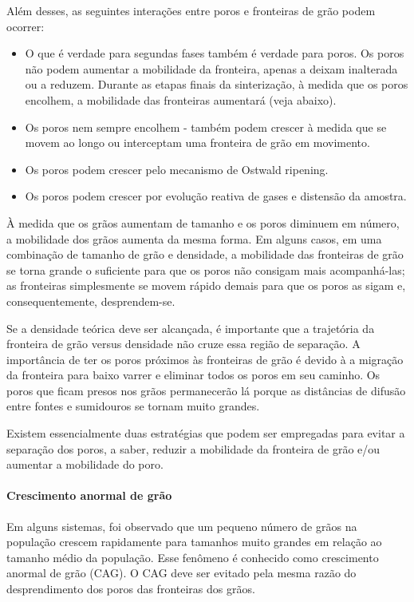 Além desses, as seguintes interações entre poros e fronteiras de grão podem ocorrer:

\begin{itemize}
    \item O que é verdade para segundas fases também é verdade para poros. Os poros não podem aumentar a mobilidade da fronteira, apenas a deixam inalterada ou a reduzem. Durante as etapas finais da sinterização, à medida que os poros encolhem, a mobilidade das fronteiras aumentará (veja abaixo).
    \item Os poros nem sempre encolhem - também podem crescer à medida que se movem ao longo ou interceptam uma fronteira de grão em movimento.
    \item Os poros podem crescer pelo mecanismo de Ostwald ripening.
    \item Os poros podem crescer por evolução reativa de gases e distensão da amostra.
\end{itemize}

À medida que os grãos aumentam de tamanho e os poros diminuem em número, a mobilidade dos grãos aumenta da mesma forma. Em alguns casos, em uma combinação de tamanho de grão e densidade, a mobilidade das fronteiras de grão se torna grande o suficiente para que os poros não consigam mais acompanhá-las; as fronteiras simplesmente se movem rápido demais para que os poros as sigam e, consequentemente, desprendem-se.

Se a densidade teórica deve ser alcançada, é importante que a trajetória da fronteira de grão versus densidade não cruze essa região de separação. A importância de ter os poros próximos às fronteiras de grão é devido à a migração da fronteira para baixo varrer e eliminar todos os poros em seu caminho. Os poros que ficam presos nos grãos permanecerão lá porque as distâncias de difusão entre fontes e sumidouros se tornam muito grandes.

Existem essencialmente duas estratégias que podem ser empregadas para evitar a separação dos poros, a saber, reduzir a mobilidade da fronteira de grão e/ou aumentar a mobilidade do poro.

\paragraph*{Crescimento anormal de grão}

Em alguns sistemas, foi observado que um pequeno número de grãos na população crescem rapidamente para tamanhos muito grandes em relação ao tamanho médio da população. Esse fenômeno é conhecido como crescimento anormal de grão (CAG). O CAG deve ser evitado pela mesma razão do desprendimento dos poros das fronteiras dos grãos.

